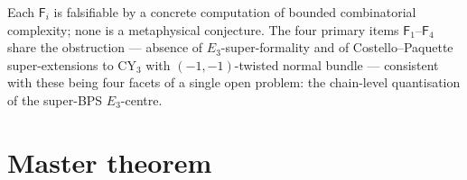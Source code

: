 \documentclass[11pt]{amsart}
\theoremstyle{definition}
\begin{document}
Each $\mathsf F_{i}$ is falsifiable by a concrete computation of
bounded combinatorial complexity; none is a metaphysical conjecture.
The four primary items $\mathsf F_{1}$--$\mathsf F_{4}$ share the
obstruction — absence of $E_{3}$-super-formality and of
Costello--Paquette super-extensions to CY$_{3}$ with
$(-1,-1)$-twisted normal bundle — consistent with these being four
facets of a single open problem: the chain-level quantisation of the
super-BPS $E_{3}$-centre.

\section{Master theorem}
\end{document}
